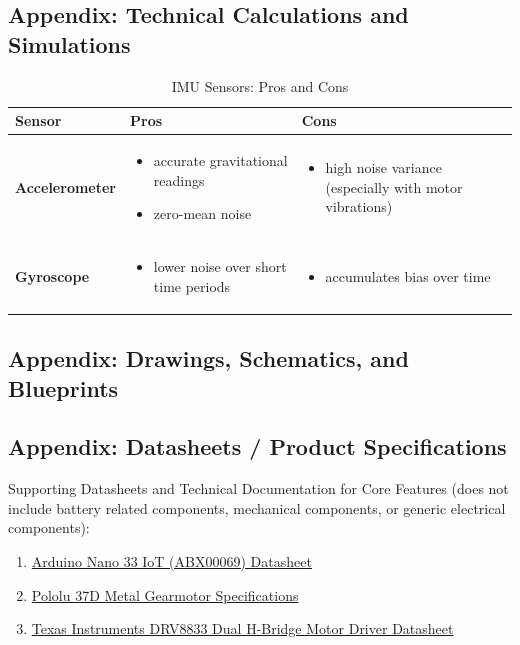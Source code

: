 \documentclass{article}
\begin{document}
\subsection{Appendix: Technical Calculations and Simulations}

\begin{table}[H]
    \centering
    \caption{IMU Sensors: Pros and Cons}
    \label{tab:imu_sensors}
    \begin{tabularx}{\textwidth}{|l|X|X|}
    \hline
    \textbf{Sensor} & \textbf{Pros} & \textbf{Cons} \\
    \hline
    \textbf{Accelerometer} &
    \begin{itemize}
        \item accurate gravitational readings
        \item zero-mean noise
    \end{itemize} &
    \begin{itemize}
        \item high noise variance (especially with motor vibrations)
    \end{itemize} \\
    \hline
    \textbf{Gyroscope} &
    \begin{itemize}
        \item lower noise over short time periods
    \end{itemize} &
    \begin{itemize}
        \item accumulates bias over time
    \end{itemize} \\
    \hline
    \end{tabularx}
\end{table}

\subsection{Appendix: Drawings, Schematics, and Blueprints}

\subsection{Appendix: Datasheets / Product Specifications}
Supporting Datasheets and Technical Documentation for Core Features (does not include battery related components, mechanical components, or generic electrical components):

\begin{enumerate}
    \item \href{https://docs.arduino.cc/resources/datasheets/ABX00069-datasheet.pdf}{Arduino Nano 33 IoT (ABX00069) Datasheet}
    \item \href{https://www.pololu.com/file/0J1736/pololu-37d-metal-gearmotors-rev-1-2.pdf}{Pololu 37D Metal Gearmotor Specifications}
    \item \href{https://www.ti.com/lit/ds/symlink/drv8833.pdf?ts=1743785858420}{Texas Instruments DRV8833 Dual H-Bridge Motor Driver Datasheet}
\end{enumerate}
\end{document}
